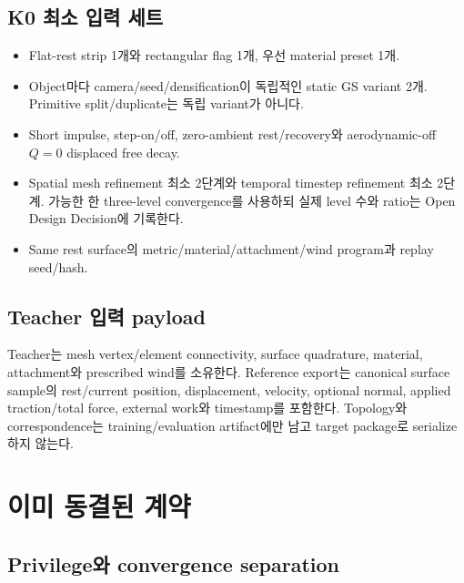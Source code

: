 \documentclass[10pt]{article}
\begin{document}
\subsection{K0 최소 입력 세트}

\begin{itemize}
  \item Flat-rest strip 1개와 rectangular flag 1개, 우선 material preset 1개.
  \item Object마다 camera/seed/densification이 독립적인 static GS variant 2개. Primitive split/duplicate는 독립 variant가 아니다.
  \item Short impulse, step-on/off, zero-ambient rest/recovery와 aerodynamic-off \(Q=0\) displaced free decay.
  \item Spatial mesh refinement 최소 2단계와 temporal timestep refinement 최소 2단계.
  가능한 한 three-level convergence를 사용하되 실제 level 수와 ratio는 Open Design Decision에 기록한다.
  \item Same rest surface의 metric/material/attachment/wind program과 replay seed/hash.
\end{itemize}

\subsection{Teacher 입력 payload}

Teacher는 mesh vertex/element connectivity, surface quadrature, material, attachment와 prescribed wind를 소유한다.
Reference export는 canonical surface sample의 rest/current position, displacement, velocity, optional normal,
applied traction/total force, external work와 timestamp를 포함한다. Topology와 correspondence는 training/evaluation
artifact에만 남고 target package로 serialize하지 않는다.

\section{이미 동결된 계약}
\label{sec:r1-chapter-3}
\label{sec:r1-contracts}

\subsection{Privilege와 convergence separation}
\end{document}
